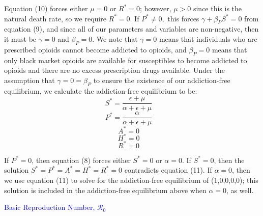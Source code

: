 \documentclass[12pt]{article}
\begin{document}
Equation (10) forces either $\mu=0$ or $R^*=0$; however, $\mu > 0$ since this is the natural death rate, so we require $R^*=0$. If $P^* \neq 0, $ this forces $\gamma + \beta_{P} S^* =0$ from equation (9), and since all of our parameters and variables are non-negative, then it must be $\gamma=0$ and $\beta_{P}=0$. We note that $\gamma=0$ means that individuals who are prescribed opioids cannot become addicted to opioids, and $\beta_{P}=0$ means that only black market opioids are available for susceptibles to become addicted to opioids and there are no excess prescription drugs available. Under the assumption that $\gamma=0=\beta_{P}$ to ensure the existence of our addiction-free equilibrium, we calculate the addiction-free equilibrium to be: \\

\[S^*=\frac{\epsilon + \mu}{\alpha + \epsilon +\mu}\quad\]
\[P^*=\frac{\alpha}{\alpha + \epsilon +\mu}\quad\]
\[A^*=0\quad\]
\[H^*=0\quad\]
\[R^*=0\quad\] 

If $P^*=0$, then equation (8) forces either $S^*=0$ or $\alpha=0$.  If $S^*=0$, then the solution  $S^*=P^*=A^*=H^*=R^*=0$ contradicts equation (11). If $\alpha=0$, then we use equation (11) to solve for the addiction-free equilibrium of (1,0,0,0,0); this solution is included in the addiction-free equilibrium above when $\alpha=0$, as well. 

\textcolor{blue}{Basic Reproduction Number, \textbf{$\mathscr{R}_0$}}  
\end{document}
